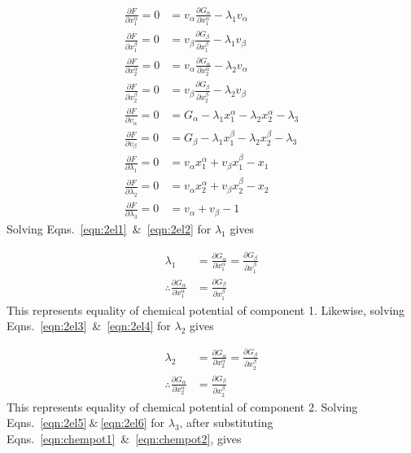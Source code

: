 \documentclass[10pt]{article}
\begin{document}
\begin{align}
  \label{eqn:2el1}
  \frac{\partial F}{\partial x_1^{\alpha}} = 0
  &= v_{\alpha} \frac{\partial G_{\alpha}}{\partial x_1^{\alpha}}
   - \lambda_1 v_{\alpha}\\
  \label{eqn:2el2}
  \frac{\partial F}{\partial x_1^{\beta}} = 0
  &= v_{\beta} \frac{\partial G_{\beta}}{\partial x_1^{\beta}}
   - \lambda_1 v_{\beta}\\
  \label{eqn:2el3}
  \frac{\partial F}{\partial x_2^{\alpha}} = 0
  &= v_{\alpha} \frac{\partial G_{\alpha}}{\partial x_2^{\alpha}}
   - \lambda_2 v_{\alpha}\\
  \label{eqn:2el4}
  \frac{\partial F}{\partial x_2^{\beta}} = 0
  &= v_{\beta} \frac{\partial G_{\beta}}{\partial x_2^{\beta}}
   - \lambda_2 v_{\beta}\\
  \label{eqn:2el5}
  \frac{\partial F}{\partial v_{\alpha}} = 0
  &= G_{\alpha} - \lambda_1 x_1^{\alpha} - \lambda_2 x_2^{\alpha}
   - \lambda_3\\
  \label{eqn:2el6}
  \frac{\partial F}{\partial v_{\beta}} = 0
  &= G_{\beta} - \lambda_1 x_1^{\beta} - \lambda_2 x_2^{\beta}
   - \lambda_3\\
  \label{eqn:2el7}
  \frac{\partial F}{\partial \lambda_1} = 0
  &= v_{\alpha} x_1^{\alpha} + v_{\beta} x_1^{\beta} - x_1\\
  \label{eqn:2el8}
  \frac{\partial F}{\partial \lambda_2} = 0
  &= v_{\alpha} x_2^{\alpha} + v_{\beta} x_2^{\beta} - x_2\\
  \label{eqn:2el9}
  \frac{\partial F}{\partial \lambda_3} = 0
  &= v_{\alpha}  + v_{\beta} - 1
\end{align}
Solving Eqns.~\ref{eqn:2el1}~\&~\ref{eqn:2el2} for $\lambda_1$ gives

\begin{align}
  \lambda_1 &= \frac{\partial G_{\alpha}}{\partial x_1^{\alpha}}
             = \frac{\partial G_{\beta}}{\partial x_1^{\beta}}\\
  \label{eqn:chempot1}
  \therefore \frac{\partial G_{\alpha}}{\partial x_1^{\alpha}}
          &= \frac{\partial G_{\beta}}{\partial x_1^{\beta}}
\end{align}
This represents equality of chemical potential of component 1.
Likewise, solving Eqns.~\ref{eqn:2el3}~\&~\ref{eqn:2el4} for $\lambda_2$ gives

\begin{align}
  \lambda_2 &= \frac{\partial G_{\alpha}}{\partial x_2^{\alpha}}
             = \frac{\partial G_{\beta}}{\partial x_2^{\beta}}\\
  \label{eqn:chempot2}
  \therefore \frac{\partial G_{\alpha}}{\partial x_2^{\alpha}}
          &= \frac{\partial G_{\beta}}{\partial x_2^{\beta}}
\end{align}
This represents equality of chemical potential of component 2. Solving
Eqns.~\ref{eqn:2el5}$~\&~$\ref{eqn:2el6} for $\lambda_3$, after substituting
Eqns.~\ref{eqn:chempot1}~\&~\ref{eqn:chempot2}, gives
\end{document}
